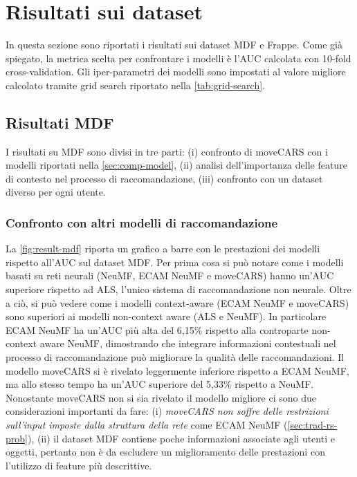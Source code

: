 \documentclass[12pt,italian]{report}
\begin{document}
\section{Risultati sui dataset} \label{sec:results}
In questa sezione sono riportati i risultati sui dataset MDF e Frappe. Come già spiegato, la metrica scelta per confrontare i modelli è l'AUC calcolata con 10-fold cross-validation. Gli iper-parametri dei modelli sono impostati al valore migliore calcolato tramite grid search riportato nella \autoref{tab:grid-search}.
\subsection{Risultati MDF}
I risultati su MDF sono divisi in tre parti: (i) confronto di moveCARS con i modelli riportati nella \autoref{sec:comp-model}, (ii) analisi dell'importanza delle feature di contesto nel processo di raccomandazione, (iii) confronto con un dataset diverso per ogni utente.

\subsubsection{Confronto con altri modelli di raccomandazione}
La \autoref{fig:result-mdf} riporta un grafico a barre con le prestazioni dei modelli rispetto all'AUC sul dataset MDF. Per prima cosa si può notare come i modelli basati su reti neurali (NeuMF, ECAM NeuMF e moveCARS) hanno un'AUC superiore rispetto ad ALS, l'unico sistema di raccomandazione non neurale. Oltre a ciò, si può vedere come i modelli context-aware (ECAM NeuMF e moveCARS) sono superiori ai modelli non-context aware (ALS e NeuMF). In particolare ECAM NeuMF ha un'AUC più alta del 6,15\%  rispetto alla controparte non-context aware NeuMF, dimostrando che integrare informazioni contestuali nel processo di raccomandazione può migliorare la qualità delle raccomandazioni. Il modello moveCARS si è rivelato leggermente inferiore rispetto a ECAM NeuMF, ma allo stesso tempo ha un'AUC superiore del 5,33\% rispetto a NeuMF. Nonostante moveCARS non si sia rivelato il modello migliore ci sono due considerazioni importanti da fare: (i) \textit{moveCARS non soffre delle restrizioni sull'input imposte dalla struttura della rete} come ECAM NeuMF (\autoref{sec:trad-rs-prob}), (ii) il dataset MDF contiene poche informazioni associate agli utenti e oggetti, pertanto non è da escludere un miglioramento delle prestazioni con l'utilizzo di feature più descrittive.
\end{document}
